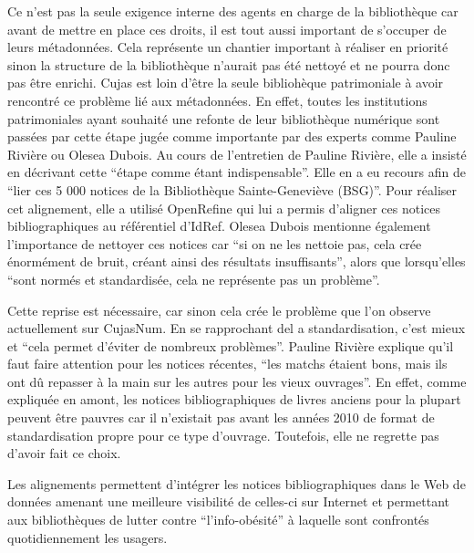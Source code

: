 Ce n'est pas la seule exigence interne des agents en charge de la bibliothèque car avant de mettre en place ces droits, il est tout aussi important de s'occuper de leurs métadonnées. Cela représente un chantier important à réaliser en priorité sinon la structure de la bibliothèque n'aurait pas été nettoyé et ne pourra donc pas être enrichi. Cujas est loin d'être la seule bibliohèque patrimoniale à avoir rencontré ce problème lié aux métadonnées. En effet, toutes les institutions patrimoniales ayant souhaité une refonte de leur bibliothèque numérique sont passées par cette étape jugée comme importante par des experts comme Pauline Rivière ou Olesea Dubois. Au cours de l'entretien de Pauline Rivière, elle a insisté en décrivant cette \enquote{étape comme étant indispensable}. Elle en a eu recours afin de \enquote{lier ces 5 000 notices de la Bibliothèque Sainte-Geneviève (BSG)}. Pour réaliser cet alignement, elle a utilisé OpenRefine qui lui a permis d'aligner ces notices bibliographiques au référentiel d'IdRef. Olesea Dubois mentionne également l'importance de nettoyer ces notices car \enquote{si on ne les nettoie pas, cela crée énormément de bruit, créant ainsi des résultats insuffisants}, alors que lorsqu'elles \enquote{sont normés et standardisée, cela ne représente pas un problème}. 

Cette reprise est nécessaire, car sinon cela crée le problème que l'on observe actuellement sur CujasNum. En se rapprochant del a standardisation, c'est mieux et \enquote{cela permet d'éviter de nombreux problèmes}. Pauline Rivière explique qu'il faut faire attention pour les notices récentes, \enquote{les matchs étaient bons, mais ils ont dû repasser à la main sur les autres pour les vieux ouvrages}. En effet, comme expliquée en amont, les notices bibliographiques de livres anciens pour la plupart peuvent être pauvres car il n'existait pas avant les années 2010 de format de standardisation propre pour ce type d'ouvrage. Toutefois, elle ne regrette pas d'avoir fait ce choix.

Les alignements permettent d'intégrer les notices bibliographiques dans le Web de données amenant une meilleure visibilité de celles-ci sur Internet et permettant aux bibliothèques de lutter contre \enquote{l'info-obésité} à laquelle sont confrontés quotidiennement les usagers. 